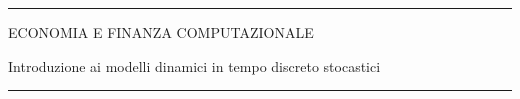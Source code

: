 \documentclass[12pt,aspectratio=169]{beamer}
\begin{document}
\begin{frame}
\unitlength 5mm

\begin{center}

\rule{\textwidth}{2pt}

\vskip3mm
ECONOMIA E FINANZA COMPUTAZIONALE

Introduzione ai modelli dinamici in tempo discreto stocastici
\rule{\textwidth}{2pt}

\end{center}

\end{frame}


\end{document}
